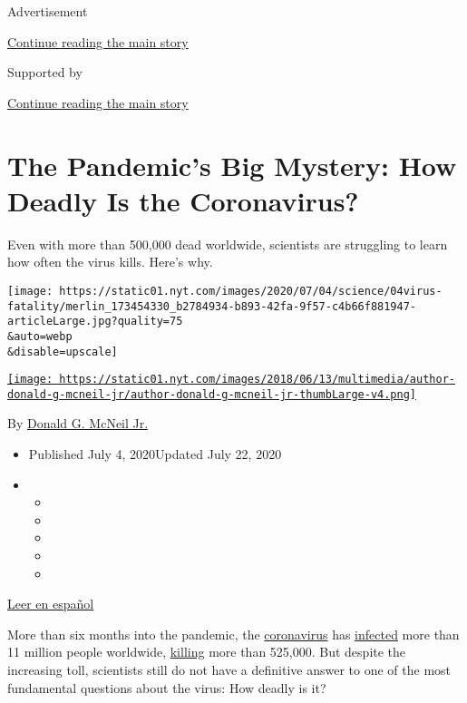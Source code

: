 Advertisement

\protect\hyperlink{after-top}{Continue reading the main story}

Supported by

\protect\hyperlink{after-sponsor}{Continue reading the main story}

\hypertarget{the-pandemics-big-mystery-how-deadly-is-the-coronavirus}{%
\section{The Pandemic's Big Mystery: How Deadly Is the
Coronavirus?}\label{the-pandemics-big-mystery-how-deadly-is-the-coronavirus}}

Even with more than 500,000 dead worldwide, scientists are struggling to
learn how often the virus kills. Here's why.

\texttt{[image: https://static01.nyt.com/images/2020/07/04/science/04virus-fatality/merlin\_173454330\_b2784934-b893-42fa-9f57-c4b66f881947-articleLarge.jpg?quality=75\\\&auto=webp\\\&disable=upscale]}

\href{https://www.nytimes.com/by/donald-g-mcneil-jr}{\texttt{[image: https://static01.nyt.com/images/2018/06/13/multimedia/author-donald-g-mcneil-jr/author-donald-g-mcneil-jr-thumbLarge-v4.png]}}

By \href{https://www.nytimes.com/by/donald-g-mcneil-jr}{Donald G. McNeil
Jr.}

\begin{itemize}
\item
  Published July 4, 2020Updated July 22, 2020
\item
  \begin{itemize}
  \item
  \item
  \item
  \item
  \item
  \end{itemize}
\end{itemize}

\href{https://www.nytimes.com/es/2020/07/06/espanol/tasa-mortalidad-fatalidad-coronavirus.html}{Leer
en español}

More than six months into the pandemic, the
\href{https://www.nytimes.com/2020/07/22/us/florida-mother-2-children-covid-19.html}{coronavirus}
has
\href{https://www.nytimes.com/2020/07/15/health/coronavirus-schools-reopening.html}{infected}
more than 11 million people worldwide,
\href{https://www.nytimes.com/2020/07/13/us/arizona-coronavirus-mark-anthony-urquiza.html}{killing}
more than 525,000. But despite the increasing toll, scientists still do
not have a definitive answer to one of the most fundamental questions
about the virus: How deadly is it?

